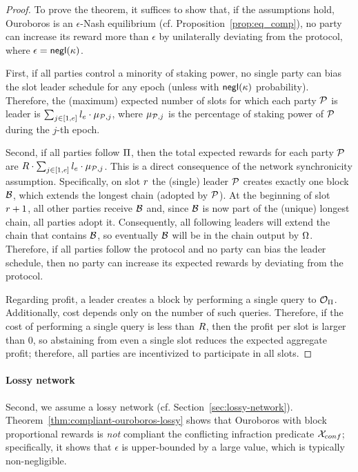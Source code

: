 \begin{proof}
    To prove the theorem, it suffices to show that, if the assumptions hold,
    Ouroboros is an $\epsilon$-Nash equilibrium (cf. Proposition~\ref{prop:eq_comp}), \ie no
    party can increase its reward more than $\epsilon$ by unilaterally deviating from the protocol, where $\epsilon=\mathsf{negl}(\kappa)$.

    First, if all parties control a minority of staking power, no single
    party can bias the slot leader schedule for any epoch (unless with $\mathsf{negl}(\kappa)$ probability). Therefore,
    the (maximum) expected number of slots for which each party $\mathcal{P}$ is
    leader is $\sum_{j \in [1, e]} l_e \cdot
    \mu_{\mathcal{P},j}$, where $\mu_{\mathcal{P},j}$ is the
    percentage of staking power of $\mathcal{P}$ during the $j$-th epoch.

    Second, if all parties follow $\Pi$, then the total expected rewards for
    each party $\mathcal{P}$ are $R \cdot \sum_{j \in [1, e]}
    l_e \cdot \mu_{\mathcal{P},j}$. This is a direct consequence
    of the network synchronicity assumption. Specifically, on slot $r$ the
    (single) leader $\mathcal{P}$ creates exactly one block $\mathcal{B}$, which extends the longest
    chain (adopted by $\mathcal{P}$).
    At the beginning of slot $r + 1$, all other parties receive
    $\mathcal{B}$ and, since $\mathcal{B}$ is now part of the (unique) longest chain, all
    parties adopt it. Consequently, all following leaders will extend the chain
    that contains $\mathcal{B}$, so eventually $\mathcal{B}$ will be in the chain output
    by $\Omega$.
    Therefore, if all parties follow the protocol and no party can bias the
    leader schedule, then no party can increase its expected rewards by
    deviating from the protocol.

    Regarding profit, a leader creates a block by performing a single
    query to $\mathcal{O}_\Pi$. Additionally, cost depends only on the number of
    such queries. Therefore, if the cost of performing a single query is less
    than $R$, then the profit per slot is larger than $0$, so abstaining
    from even a single slot reduces the expected aggregate profit; therefore,
    all parties are incentivized to participate in all slots.
\end{proof}

\paragraph{Lossy network}
Second, we assume a lossy network (cf. Section~\ref{sec:lossy-network}).
Theorem~\ref{thm:compliant-ouroboros-lossy} shows that Ouroboros with block
proportional rewards is \emph{not} compliant \wrt the conflicting infraction
predicate $\mathcal{X}_{conf}$; specifically, it shows that $\epsilon$
is upper-bounded by a large value, which is typically non-negligible.


